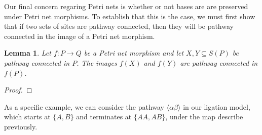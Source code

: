 \documentclass[aps,prd,onecolumn,nofootinbib,letterpaper,preprintnumbers,superscriptaddress,eqsecnum]{revtex4}
\newtheorem{lemma}{Lemma}
\theoremstyle{definition}
\newcommand{\pathway}[1]{\langle#1\rangle}
\newcommand{\red}[1]{{\color{red}#1}}
\newcommand{\TODO}[1]{\noindent\red{\textbf{TODO:}~#1}}
\begin{document}
Our final concern regaring Petri nets is whether or not bases are are preserved under Petri net morphisms.
To establish that this is the case, we must first show that if two sets of sites are pathway connected, then they will be pathway connected in the image of a Petri net morphism.
\begin{lemma}\label{lem:image-of-pathways}
    Let $f: P \rightarrow Q$ be a Petri net morphism and let $X, Y \subseteq S(P)$ be pathway connected in $P$.
    The images $f(X)$ and $f(Y)$ are pathway connected in $f(P)$.
\end{lemma}
\begin{proof}
    \TODO{Complete}
\end{proof}

As a specific example, we can consider the pathway $\pathway{\alpha\beta}$ in our ligation model, which starts at $\{A, B\}$ and terminates at $\{AA, AB\}$, under the map describe previously.
\end{document}
